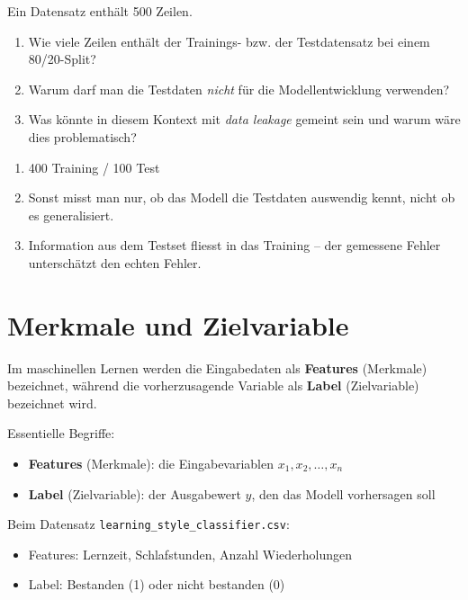 \begin{myexercise}
    Ein Datensatz enthält 500 Zeilen.
    \begin{enumerate}
        \item Wie viele Zeilen enthält der Trainings- bzw. der Testdatensatz bei einem 80/20-Split?
        \item Warum darf man die Testdaten \emph{nicht} für die Modellentwicklung verwenden?
        \item Was könnte in diesem Kontext mit \emph{data leakage} gemeint sein und warum wäre dies problematisch?
    \end{enumerate}
    \begin{myanswer}
        \begin{enumerate}
            \item 400 Training / 100 Test \quad
            \item Sonst misst man nur, ob das Modell die Testdaten auswendig kennt, nicht ob es generalisiert. \quad
            \item Information aus dem Testset fliesst in das Training -- der gemessene Fehler unterschätzt den echten Fehler.
        \end{enumerate}
    \end{myanswer}
\end{myexercise}

\section{Merkmale und Zielvariable}
Im maschinellen Lernen werden die Eingabedaten als \textbf{Features} (Merkmale) bezeichnet, während die vorherzusagende Variable als \textbf{Label} (Zielvariable) bezeichnet wird.
\begin{mydefinition}
    Essentielle Begriffe:
    \begin{itemize}
        \item \textbf{Features} (Merkmale): die Eingabevariablen $x_1, x_2, \ldots, x_n$
        \item \textbf{Label} (Zielvariable): der Ausgabewert $y$, den das Modell vorhersagen soll
    \end{itemize}
\end{mydefinition}

\begin{myexample}
    Beim Datensatz \texttt{learning\_style\_classifier.csv}:
    \begin{itemize}
        \item Features: Lernzeit, Schlafstunden, Anzahl Wiederholungen
        \item Label: Bestanden (1) oder nicht bestanden (0)
    \end{itemize}
\end{myexample}

